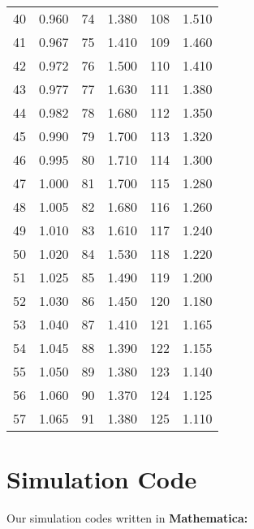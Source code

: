 \documentclass{mcmthesis}
\begin{document}
\begin{appendices}
\begin{table}[htbp]
\begin{tabular}{cccccc}
				40 & 0.960 & 74 & 1.380 & 108 & 1.510 \\
				41 & 0.967 & 75 & 1.410 & 109 & 1.460 \\
				42 & 0.972 & 76 & 1.500 & 110 & 1.410 \\
				43 & 0.977 & 77 & 1.630 & 111 & 1.380 \\
				44 & 0.982 & 78 & 1.680 & 112 & 1.350 \\
				45 & 0.990 & 79 & 1.700 & 113 & 1.320 \\
				46 & 0.995 & 80 & 1.710 & 114 & 1.300 \\
				47 & 1.000 & 81 & 1.700 & 115 & 1.280 \\
				48 & 1.005 & 82 & 1.680 & 116 & 1.260 \\
				49 & 1.010 & 83 & 1.610 & 117 & 1.240 \\
				50 & 1.020 & 84 & 1.530 & 118 & 1.220 \\
				51 & 1.025 & 85 & 1.490 & 119 & 1.200 \\
				52 & 1.030 & 86 & 1.450 & 120 & 1.180 \\
				53 & 1.040 & 87 & 1.410 & 121 & 1.165 \\
				54 & 1.045 & 88 & 1.390 & 122 & 1.155 \\
				55 & 1.050 & 89 & 1.380 & 123 & 1.140 \\
				56 & 1.060 & 90 & 1.370 & 124 & 1.125 \\
				57 & 1.065 & 91 & 1.380 & 125 & 1.110 \\
				\hline
			\end{tabular}
			\label{Tab-ForPsi}
		\end{table}
		
		
		\section{Simulation Code}
		
		
		Our simulation codes written in \textcolor[rgb]{0.98,0.00,0.00}{\textbf{Mathematica:}}
		
		
	\end{appendices}
\end{document}
